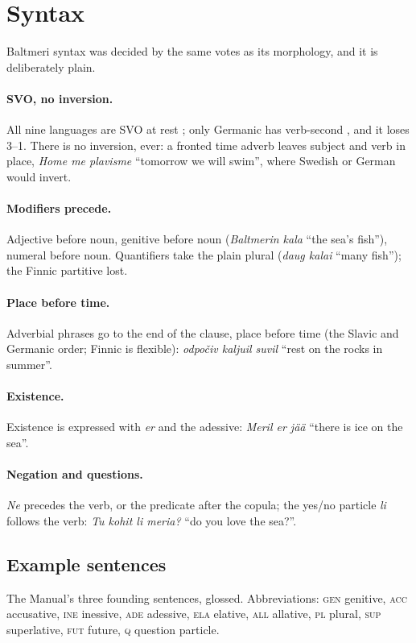 \section{Syntax}\label{sec:syntax}

Baltmeri syntax was decided by the same votes as its morphology, and it is deliberately plain.

\paragraph{SVO, no inversion.} All nine languages are SVO at rest \citep{dryer2013}; only Germanic has verb-second \citep{holmberg2015}, and it loses 3--1. There is no inversion, ever: a fronted time adverb leaves subject and verb in place, \emph{Home me plavisme} ``tomorrow we will swim'', where Swedish or German would invert.

\paragraph{Modifiers precede.} Adjective before noun, genitive before noun (\emph{Baltmerin kala} ``the sea's fish''), numeral before noun. Quantifiers take the plain plural (\emph{daug kalai} ``many fish''); the Finnic partitive lost.

\paragraph{Place before time.} Adverbial phrases go to the end of the clause, place before time (the Slavic and Germanic order; Finnic is flexible): \emph{odpočiv kaljuil suvil} ``rest on the rocks in summer''.

\paragraph{Existence.} Existence is expressed with \emph{er} and the adessive: \emph{Meril er jää} ``there is ice on the sea''.

\paragraph{Negation and questions.} \emph{Ne} precedes the verb, or the predicate after the copula; the yes/no particle \emph{li} follows the verb: \emph{Tu kohit li meria?} ``do you love the sea?''.

\subsection{Example sentences}
The Manual's three founding sentences, glossed. Abbreviations: \textsc{gen} genitive, \textsc{acc} accusative, \textsc{ine} inessive, \textsc{ade} adessive, \textsc{ela} elative, \textsc{all} allative, \textsc{pl} plural, \textsc{sup} superlative, \textsc{fut} future, \textsc{q} question particle.

